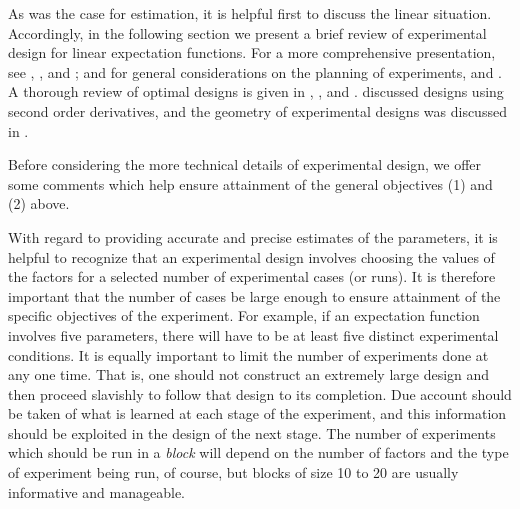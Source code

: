 As was the case for estimation, it is helpful first to
discuss the linear situation.
Accordingly, in the following section we present a brief review
of experimental design for linear expectation functions.
For a more comprehensive presentation, see
,
, and ; and
for general considerations on the planning of experiments,
 and
.
A thorough review of optimal designs is given in
,
, and .
 discussed designs using second order
derivatives, and
the geometry of experimental designs was discussed in
.

Before considering the more technical details of experimental
design, we offer some comments which help ensure
attainment of the general objectives (1) and (2) above.

With regard to providing accurate and precise estimates of the
parameters, it is helpful to recognize that an experimental
design involves choosing the values of the factors for a selected
number of experimental cases (or runs).
It is therefore important that the number of cases be large
enough to ensure attainment of the specific objectives of the experiment.
For example, if an expectation function involves five
parameters, there will have to be at least five distinct
experimental conditions.
It is equally important to limit the number of experiments done
at any one time.
That is, one should not construct an extremely large design and
then proceed slavishly to follow that design to its completion.
Due account should be taken of what is learned at each stage of
the experiment, and this information should be exploited in the
design of the next stage.
The number of experiments which should be run in a \emph{block}
will depend on the number of factors and the type of experiment
being run, of course, but blocks of size 10 to 20 are usually
informative and manageable.

